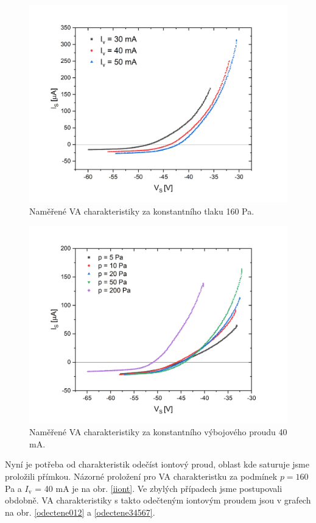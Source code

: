 \documentclass[a4paper,12pt]{article}
\begin{document}
\begin{figure}[h!]
	\centering
	\includegraphics[width=145mm]{namerene012.png}
	\caption{Naměřené VA charakteristiky za konstantního tlaku 160 \si{\pascal}.}
	\label{namerene012}	
\end{figure}

\begin{figure}[h!]
	\centering
	\includegraphics[width=145mm]{namerene34567.png}
	\caption{Naměřené VA charakteristiky za konstantního výbojového proudu 40 \si{\milli\ampere}.}
	\label{namerene34567}
\end{figure}

\newpage
Nyní je potřeba od charakteristik odečíst iontový proud, oblast kde saturuje jsme proložili 
přímkou. Názorné proložení pro VA
charakteristku za podmínek $p = 160$ \si{\pascal} a $I_\text{v}$ = 40 \si{\milli\ampere} je na obr. \ref{iiont}. Ve zbylých případech
jsme postupovali obdobně. VA charakteristiky s takto odečteným iontovým proudem jsou v grafech na obr. \ref{odectene012} a
\ref{odectene34567}.
\end{document}
